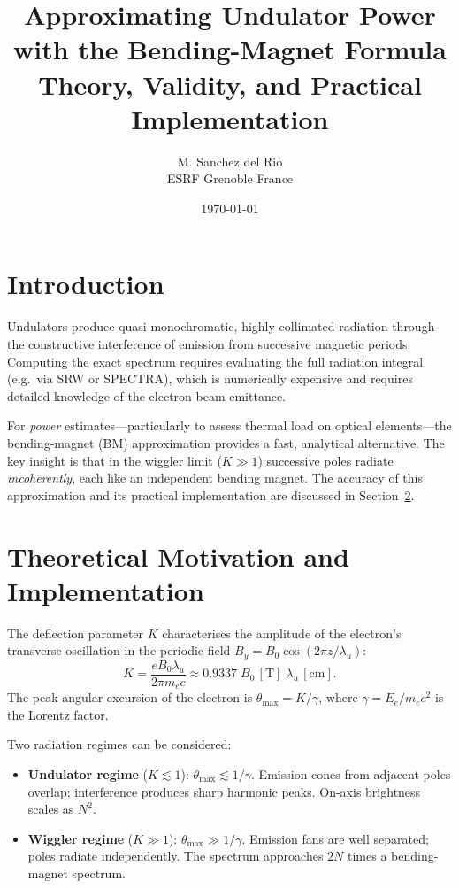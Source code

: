 \documentclass[11pt,a4paper]{article}
\title{\textbf{Approximating Undulator Power with the Bending-Magnet Formula}\\[0.5em]
\large Theory, Validity, and Practical Implementation}
\author{M. Sanchez del Rio\\ESRF Grenoble France}
\date{\today}
\begin{document}
\maketitle
\tableofcontents
\bigskip

\section{Introduction}

Undulators produce quasi-monochromatic, highly collimated radiation through the constructive
interference of emission from successive magnetic periods.  Computing the exact spectrum
requires evaluating the full radiation integral (e.g.\ via SRW or SPECTRA), which is
numerically expensive and requires detailed knowledge of the electron beam emittance.

For \emph{power} estimates---particularly to assess thermal load on optical elements---the
bending-magnet (BM) approximation provides a fast, analytical alternative.  The key insight
is that in the wiggler limit ($K \gg 1$) successive poles radiate \emph{incoherently}, each
like an independent bending magnet.  The accuracy of this approximation and its practical
implementation are discussed in Section~\ref{sec:theory}.

\section{Theoretical Motivation and Implementation}
\label{sec:theory}

The deflection parameter $K$ characterises the amplitude of the electron's transverse
oscillation in the periodic field $B_y = B_0 \cos(2\pi z / \lambda_u)$:
\begin{equation}
  K = \frac{e B_0 \lambda_u}{2\pi m_e c}
    \approx 0.9337\; B_0\,[\text{T}]\;\lambda_u\,[\text{cm}].
\end{equation}
The peak angular excursion of the electron is $\theta_{\max} = K/\gamma$, where
$\gamma = E_e / m_e c^2$ is the Lorentz factor.

Two radiation regimes can be considered:
\begin{itemize}
  \item \textbf{Undulator regime} ($K \lesssim 1$): $\theta_{\max} \lesssim 1/\gamma$.
        Emission cones from adjacent poles overlap; interference produces sharp harmonic
        peaks.  On-axis brightness scales as $N^2$.
  \item \textbf{Wiggler regime} ($K \gg 1$): $\theta_{\max} \gg 1/\gamma$.
        Emission fans are well separated; poles radiate independently.
        The spectrum approaches $2N$ times a bending-magnet spectrum.
\end{itemize}
\end{document}
